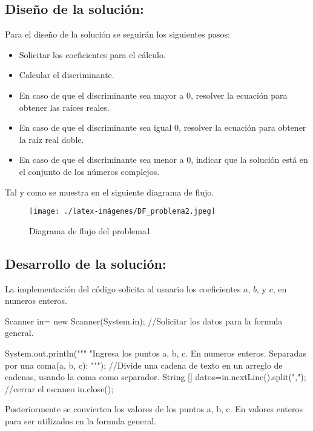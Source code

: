 \subsection{\textbf{Diseño de la solución:}}

Para el diseño de la solución se seguirán los siguientes pasos:
\begin{itemize}
    \item Solicitar los coeficientes para el cálculo.
    \item Calcular el discriminante.
    \item En caso de que el discriminante sea mayor a 0, resolver la ecuación para obtener las raíces reales.
    \item En caso de que el discriminante sea igual 0, resolver la ecuación para obtener la raíz real doble.
    \item En caso de que el discriminante sea menor a 0, indicar que la solución está en el conjunto de los números complejos.
\end{itemize}

Tal y como se muestra en el siguiente diagrama de flujo.

\begin{figure}[h!]
    \centering
    \texttt{[image: ./latex-imágenes/DF\_problema2.jpeg]}
    \caption{Diagrama de flujo del problema1}
    \label{fig:Diagramadeflujodel problema1}
\end{figure}

\subsection{\textbf{Desarrollo de la solución:}}
La implementación del código solicita al usuario los coeficientes \(a\), \(b\), y \(c\), en numeros enteros. 
\begin{javaCode}
 Scanner in= new Scanner(System.in);
        //Solicitar los datos para la formula general.
        
        System.out.println("""
                           "Ingresa los puntos a, b, c.
                           En numeros enteros.
                           Separadas por una coma(a, b, c): 
                           """);
        //Divide una cadena de texto en un arreglo de cadenas, usando la coma como separador.
        String [] datos=in.nextLine().split(",");
        //cerrar el escaneo
        in.close();
        
\end{javaCode}
Posteriormente se convierten los valores de los puntos a, b, c. En valores enteros para ser utilizados  en la formula general.


